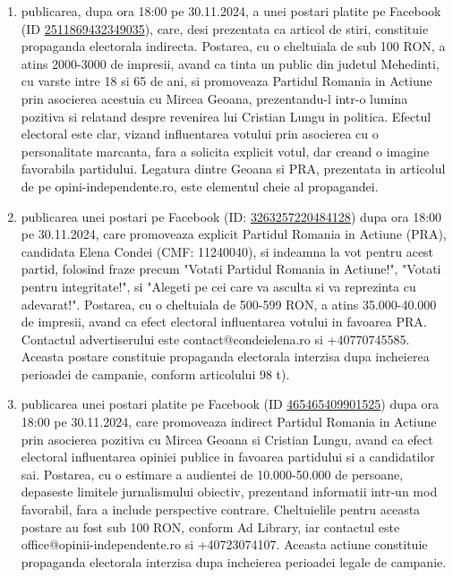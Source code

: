 \documentclass[a4paper,12pt]{article}
\begin{document}
\begin{enumerate}[leftmargin=*, label=\arabic*.)]
    \item publicarea, dupa ora 18:00 pe 30.11.2024, a unei postari platite pe Facebook (ID \href{https://www.facebook.com/ads/library/?id=2511869432349035}{2511869432349035}), care, desi prezentata ca articol de stiri, constituie propaganda electorala indirecta. Postarea, cu o cheltuiala de sub 100 RON, a atins 2000-3000 de impresii, avand ca tinta un public din judetul Mehedinti, cu varste intre 18 si 65 de ani, si promoveaza Partidul Romania in Actiune prin asocierea acestuia cu Mircea Geoana, prezentandu-l intr-o lumina pozitiva si relatand despre revenirea lui Cristian Lungu in politica.  Efectul electoral este clar, vizand influentarea votului prin asocierea cu o personalitate marcanta, fara a solicita explicit votul, dar creand o imagine favorabila partidului.  Legatura dintre Geoana si PRA, prezentata in articolul de pe opini-independente.ro, este elementul cheie al propagandei.
    \item publicarea unei postari pe Facebook (ID: \href{https://www.facebook.com/ads/library/?id=3263257220484128}{3263257220484128}) dupa ora 18:00 pe 30.11.2024, care promoveaza explicit Partidul Romania in Actiune (PRA), candidata Elena Condei (CMF: 11240040), si indeamna la vot pentru acest partid, folosind fraze precum "Votati Partidul Romania in Actiune!", "Votati pentru integritate!", si "Alegeti pe cei care va asculta si va reprezinta cu adevarat!".  Postarea, cu o cheltuiala de 500-599 RON, a atins 35.000-40.000 de impresii, avand ca efect electoral influentarea votului in favoarea PRA.  Contactul advertiserului este contact@condeielena.ro si +40770745585.  Aceasta postare constituie propaganda electorala interzisa dupa incheierea perioadei de campanie, conform articolului 98 t).
    \item publicarea unei postari platite pe Facebook (ID \href{https://www.facebook.com/ads/library/?id=465465409901525}{465465409901525}) dupa ora 18:00 pe 30.11.2024, care promoveaza indirect Partidul Romania in Actiune prin asocierea pozitiva cu Mircea Geoana si Cristian Lungu, avand ca efect electoral influentarea opiniei publice in favoarea partidului si a candidatilor sai. Postarea, cu o estimare a audientei de 10.000-50.000 de persoane, depaseste limitele jurnalismului obiectiv, prezentand informatii intr-un mod favorabil, fara a include perspective contrare.  Cheltuielile pentru aceasta postare au fost sub 100 RON, conform Ad Library, iar contactul este office@opinii-independente.ro si +40723074107.  Aceasta actiune constituie propaganda electorala interzisa dupa incheierea perioadei legale de campanie.

\end{enumerate}
\end{document}
